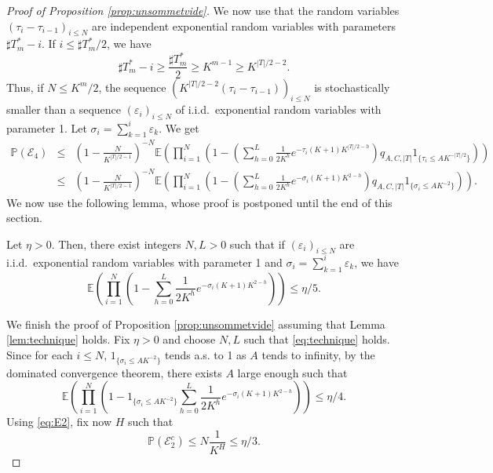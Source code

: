 \documentclass[10pt,a4paper]{amsart}
\newcommand{\E}{\mathbb{E}}
\newcommand{\Tf}{T}
\renewcommand{\P}{\mathbb{P}}
\begin{document}
\begin{proof}[Proof of Proposition \ref{prop:unsommetvide}]
We now use that the random variables $(\tau_i-\tau_{i-1})_{i\le N}$ are independent exponential random variables with parameters $\sharp\Tf_m^* - i$. If $i\le \sharp\Tf_m^*/2$, we have
$$\sharp\Tf_m^* - i\ge  \frac{\sharp\Tf_m^*}{2}\ge K^{m-1}\ge K^{|\Tf|/2-2}.$$
Thus, if $N\le K^m/2$, the sequence $(K^{|\Tf|/2-2}(\tau_i-\tau_{i-1}))_{i\le N}$ is stochastically smaller than a sequence $(\varepsilon_i)_{i\le N}$ of i.i.d.\ exponential random variables with parameter 1. Let $\sigma_i=\sum_{k=1}^i\varepsilon_k$.
We get 
\begin{eqnarray*}
\P(\mathcal{E}_4)
&\le&  \left(1-\frac{N}{K^{|\Tf|/2-1}}\right)^{-N}\E\left(\prod_{i=1}^N \left(1-\left(\sum_{h=0}^L\frac{1}{2K^h}e^{-\tau_i(K+1)K^{|\Tf|/2-h}}\right) q_{A,C,|\Tf|}1_{\{\tau_i\le A K^{-|\Tf|/2}\}}
\right)\right)\\
&\le& \left(1-\frac{N}{K^{|\Tf|/2-1}}\right)^{-N}\E\left(\prod_{i=1}^N \left(1-\left(\sum_{h=0}^L\frac{1}{2K^h}e^{-\sigma_i(K+1)K^{2-h}}\right) q_{A,C,|\Tf|}1_{\{\sigma_i\le A K^{-2}\}}
\right)\right).
\end{eqnarray*}
We now use the following lemma, whose proof is postponed until the end of this section.
\begin{lemma}\label{lem:technique}
    Let $\eta>0$. Then, there exist integers $N,L>0$ such that if $(\varepsilon_i)_{i\le N}$ are i.i.d.\ exponential random variables with parameter 1 and $\sigma_i=\sum_{k=1}^i\varepsilon_k$, we have 
    \begin{equation}\label{eq:technique}
        \E\left(\prod_{i=1}^N \left(1-\sum_{h=0}^L\frac{1}{2K^h}e^{-\sigma_i(K+1)K^{2-h}}\right) \right)\le \eta/5.
    \end{equation}    
\end{lemma}
We finish the proof of Proposition \ref{prop:unsommetvide} assuming that Lemma \ref{lem:technique} holds. Fix $\eta>0$ and choose $N,L$ such that \eqref{eq:technique} holds. Since for each $i\le N$, $1_{\{\sigma_i\le A K^{-2}\}}$ tends a.s. to 1 as $A$ tends to infinity, by the dominated convergence theorem, there exists $A$ large enough such that 
\begin{equation*}
        \E\left(\prod_{i=1}^N \left(1-1_{\{\sigma_i\le A K^{-2}\}}\sum_{h=0}^L\frac{1}{2K^h}e^{-\sigma_i(K+1)K^{2-h}}\right) \right)\le \eta/4.
    \end{equation*}
Using \eqref{eq:E2}, fix now $H$ such that 
\begin{equation*}
\P(\mathcal{E}_2^c)\le N\frac{1}{K^{H}}\le \eta/3.
\end{equation*}

\end{proof}
\end{document}
